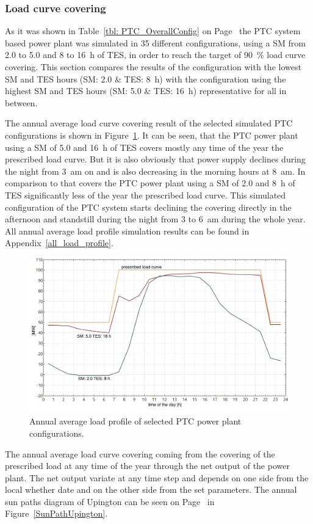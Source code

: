 \subsubsection{Load curve covering}
As it was shown in Table~\ref{tbl: PTC_OverallConfig} on Page~\pageref{tbl: PTC_OverallConfig} the PTC system based power plant was simulated in 35 different configurations, using a SM from 2.0 to 5.0 and 8 to 16~h of TES, in order to reach the target of 90~\% load curve covering. This section compares the results of the configuration with the lowest SM and TES hours (SM: 2.0 \& TES: 8~h) with the configuration using the highest SM and TES hours  (SM: 5.0 \& TES: 16~h) representative for all in between.  

The annual average load curve covering result of the selected simulated PTC configurations is shown in Figure~\ref{PTC_annual_profil}. It can be seen, that the PTC power plant using a SM of 5.0 and 16~h of TES covers mostly any time of the year the prescribed load curve. But it is also obviously that power supply declines during the night from 3~am on and is also decreasing in the morning hours at 8~am. In comparison to that covers the PTC power plant using a SM of 2.0 and 8~h of TES significantly less of the year the prescribed load curve. This simulated configuration of the PTC system starts declining the covering directly in the afternoon and standstill during the night from 3 to 6~am during the whole year. All annual average load profile simulation results can be found in Appendix~\ref{all_load_profile}.

\begin{figure}[htbp]  
\centering
\includegraphics[width=0.8\linewidth]{FIG/PTC_annual_profil}
\caption[Annual average load profile of selected PTC power plant configurations.]{Annual average load profile of selected PTC power plant configurations.}\label{PTC_annual_profil}
\end{figure}
The annual average load curve covering coming from the covering of the prescribed load at any time of the year through the net output of the power plant. The net output variate at any time step and depends on one side from the local whether date and on the other side from the set parameters. The annual sun paths diagram of Upington can be seen on Page~\pageref{SunPathUpington} in Figure~\ref{SunPathUpington}. 

